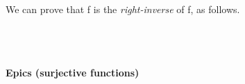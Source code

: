 \ccpad
We can prove that  \ab f is the \emph{right-inverse} of \ab f, as follows. %
\ccpad
\begin{code}%
\>[1]\AgdaSpace{}%
\AgdaSymbol{:}\AgdaSpace{}%
\AgdaSymbol{(}\AgdaSpace{}%
\AgdaSymbol{:}\AgdaSpace{}%
\AgdaSpace{}%
\AgdaSpace{}%
\AgdaSymbol{)\{}\AgdaSpace{}%
\AgdaSymbol{:}\AgdaSpace{}%
\AgdaSymbol{\}(}\AgdaSpace{}%
\AgdaSymbol{:}\AgdaSpace{}%
\AgdaSpace{}%
\AgdaSpace{}%
\AgdaSpace{}%
\AgdaSymbol{)}\AgdaSpace{}%
\AgdaSpace{}%
\AgdaSymbol{(}\AgdaSpace{}%
\AgdaSpace{}%
\AgdaSymbol{)}\AgdaSpace{}%
\AgdaSpace{}%
\<%
\\
%
\>[1]\AgdaSpace{}%
\AgdaSpace{}%
\AgdaSymbol{\{}\AgdaSpace{}%
\AgdaDottedPattern{\AgdaSymbol{)}}\AgdaSymbol{\}}\AgdaSpace{}%
\AgdaSymbol{(}\AgdaSpace{}%
\AgdaSymbol{)}\AgdaSpace{}%
\AgdaSymbol{=}\AgdaSpace{}%
\<%
\\
%
\>[1]\AgdaSpace{}%
\AgdaSpace{}%
\AgdaSymbol{(}\AgdaSpace{}%
\AgdaSymbol{\AgdaUnderscore{}}\AgdaSpace{}%
\AgdaSymbol{\AgdaUnderscore{}}\AgdaSpace{}%
\AgdaSymbol{)}\AgdaSpace{}%
\AgdaSymbol{=}\AgdaSpace{}%
\AgdaSpace{}%
\<%
\end{code}





\paragraph*{Epics (surjective functions)} %

